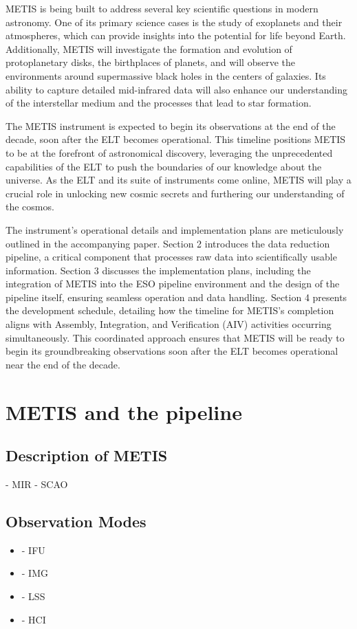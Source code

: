 \documentclass[a4paper]{spie}  %
\begin{document}
METIS is being built to address several key scientific questions in modern astronomy. One of its primary science cases is the study of exoplanets and their atmospheres, which can provide insights into the potential for life beyond Earth. Additionally, METIS will investigate the formation and evolution of protoplanetary disks, the birthplaces of planets, and will observe the environments around supermassive black holes in the centers of galaxies. Its ability to capture detailed mid-infrared data will also enhance our understanding of the interstellar medium and the processes that lead to star formation.

The METIS instrument is expected to begin its observations at the end of the decade, soon after the ELT becomes operational. This timeline positions METIS to be at the forefront of astronomical discovery, leveraging the unprecedented capabilities of the ELT to push the boundaries of our knowledge about the universe. As the ELT and its suite of instruments come online, METIS will play a crucial role in unlocking new cosmic secrets and furthering our understanding of the cosmos.

The instrument's operational details and implementation plans are meticulously outlined in the accompanying paper. Section 2 introduces the data reduction pipeline, a critical component that processes raw data into scientifically usable information. Section 3 discusses the implementation plans, including the integration of METIS into the ESO pipeline environment and the design of the pipeline itself, ensuring seamless operation and data handling. Section 4 presents the development schedule, detailing how the timeline for METIS's completion aligns with Assembly, Integration, and Verification (AIV) activities occurring simultaneously. This coordinated approach ensures that METIS will be ready to begin its groundbreaking observations soon after the ELT becomes operational near the end of the decade. 



\section{METIS and the pipeline}
\label{sec:environment}

\subsection{Description of METIS}
\label{ssec:env_metis}
	- MIR
	- SCAO
\subsection{Observation Modes}
\label{ssec:env_modes}
 \begin{itemize}
     \item - IFU
     \item - IMG
     \item - LSS
     \item - HCI
 \end{itemize}
 
\end{document}
